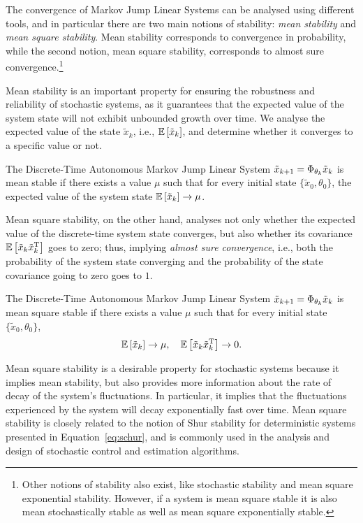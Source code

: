 The convergence of Markov Jump Linear Systems can be analysed using different tools, and in particular there are two main notions of stability: \emph{mean stability} and \emph{mean square stability}.
Mean stability corresponds to convergence in probability, while the second notion, mean square stability, corresponds to almost sure convergence.\footnote{Other notions of stability also exist, like stochastic stability and mean square exponential stability. However, if a system is mean square stable it is also mean stochastically stable as well as mean square exponentially stable.}%

Mean stability is an important property for ensuring the robustness and reliability of stochastic systems, as it guarantees that the expected value of the system state will not exhibit unbounded growth over time.
We analyse the expected value of the state $\tilde{x}_k$, i.e., $\mathbb{E}\left[ \tilde{x}_k \right]$, and determine whether it converges to a specific value or not.

\begin{definition}%
    The Discrete-Time Autonomous Markov Jump Linear System $\tilde{x}_{k+1} = \Phi_{\theta_k} \tilde{x}_k$ is mean stable if there exists a value $\mu$ such that for every initial state $\{\tilde{x}_0, \theta_0\}$, the expected value of the system state $\mathbb{E}\left[ \tilde{x}_k \right] \to \mu$.
\end{definition}

Mean square stability, on the other hand, analyses not only whether the expected value of the discrete-time system state converges, but also whether its covariance $\mathbb{E}\left[ \tilde{x}_k \tilde{x}^{\mathrm{\small{T}}}_k \right]$ goes to zero; thus, implying \emph{almost sure convergence}, i.e., both the probability of the system state converging and the probability of the state covariance going to zero goes to $1$.

\begin{definition}%
    The Discrete-Time Autonomous Markov Jump Linear System $\tilde{x}_{k+1} = \Phi_{\theta_k} \tilde{x}_k$ is mean square stable if there exists a value $\mu$ such that for every initial state $\{\tilde{x}_0, \theta_0\}$,
    \begin{equation*}
        \mathbb{E}\left[ \tilde{x}_k \right] \to \mu, \quad \mathbb{E}\left[ \tilde{x}_k \tilde{x}^{\mathrm{\small{T}}}_k \right] \to 0.
    \end{equation*}
\end{definition}
Mean square stability is a desirable property for stochastic systems because it implies mean stability, but also provides more information about the rate of decay of the system's fluctuations.
In particular, it implies that the fluctuations experienced by the system will decay exponentially fast over time.
Mean square stability is closely related to the notion of Shur stability for deterministic systems presented in Equation~\eqref{eq:schur}, and is commonly used in the analysis and design of stochastic control and estimation algorithms.

